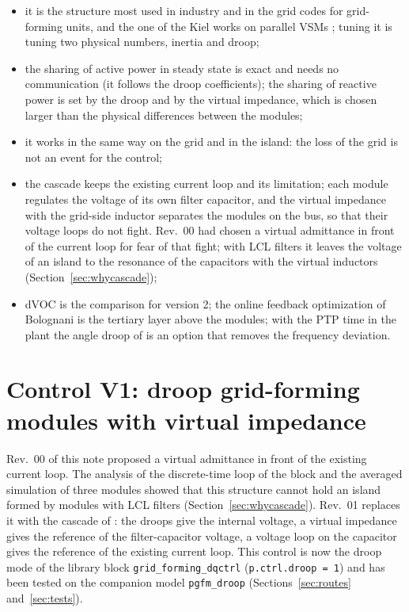 \documentclass[11pt,a4paper]{scrartcl}
\newcommand{\code}[1]{\texttt{#1}}
\begin{document}
\begin{onehalfspace}
\begin{itemize}[nosep]
	\item it is the structure most used in industry and in the grid codes for grid-forming units, and the one of the Kiel works on parallel VSMs \cite{rosso2019, rosso2021}; tuning it is tuning two physical numbers, inertia and droop;
	\item the sharing of active power in steady state is exact and needs no communication (it follows the droop coefficients); the sharing of reactive power is set by the droop and by the virtual impedance, which is chosen larger than the physical differences between the modules;
	\item it works in the same way on the grid and in the island: the loss of the grid is not an event for the control;
	\item the cascade keeps the existing current loop and its limitation; each module regulates the voltage of its own filter capacitor, and the virtual impedance with the grid-side inductor separates the modules on the bus, so that their voltage loops do not fight. Rev.~00 had chosen a virtual admittance in front of the current loop for fear of that fight; with LCL filters it leaves the voltage of an island to the resonance of the capacitors with the virtual inductors (Section~\ref{sec:whycascade});
	\item dVOC \cite{colombino2019} is the comparison for version 2; the online feedback optimization of Bolognani \cite{hauswirth2024} is the tertiary layer above the modules; with the PTP time in the plant the angle droop of \cite{golsorkhi2017} is an option that removes the frequency deviation.
\end{itemize}

\section{Control V1: droop grid-forming modules with virtual impedance}
\label{sec:v1}

Rev.~00 of this note proposed a virtual admittance in front of the existing current loop. The analysis of the discrete-time loop of the block and the averaged simulation of three modules showed that this structure cannot hold an island formed by modules with LCL filters (Section~\ref{sec:whycascade}). Rev.~01 replaces it with the cascade of \cite{pogaku2007, darco2015}: the droops give the internal voltage, a virtual impedance gives the reference of the filter-capacitor voltage, a voltage loop on the capacitor gives the reference of the existing current loop. This control is now the droop mode of the library block \code{grid\_forming\_dqctrl} (\code{p.ctrl.droop = 1}) and has been tested on the companion model \code{pgfm\_droop} (Sections~\ref{sec:routes} and~\ref{sec:tests}).


\end{onehalfspace}
\end{document}
